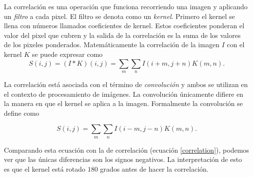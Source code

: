 


\begin{remark}
La correlación es una operación que funciona recorriendo una imagen y aplicando un
\textit{filtro} a cada pixel. El filtro se denota como un \textit{kernel}. Primero 
el kernel se llena con números llamados coeficientes de kernel. Estos coeficientes 
ponderan el valor del pixel que cubren y la salida de la correlación es la suma
de los valores de los pixeles ponderados. Matemáticamente la correlación de la imagen
$I$ con el kernel $K$ se puede expresar como
\begin{equation}\label{correlation}
    S(i,j) = (I * K)(i,j) = \sum_{m} \sum_{n} I(i+m, j+n) K(m,n).
\end{equation}
\end{remark}

La correlación está asociada con el término de \textit{convolución} y ambos se utilizan
en el contexto de procesamiento de imágenes. La convolución únicamente difiere en la manera
en que el kernel se aplica a la imagen. Formalmente la convolución se define como

\[
S(i,j) = \sum_{m} \sum_{n} I(i-m, j-n) K(m,n).
\]

Comparando esta ecuación con la de correlación (ecuación \ref{correlation}), podemos
ver que las únicas diferencias son los signos negativos. La interpretación de esto
es que el kernel está rotado $180$ grados antes de hacer la correlación.

